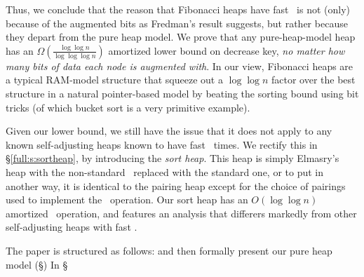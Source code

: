 Thus, we conclude that the reason that Fibonacci heaps have fast \opDc\ is not (only) because of the augmented bits as Fredman's result suggests, but rather because they depart from the pure heap model. We prove that any pure-heap-model heap has an $\Omega\left( \frac{\log \log n}{\log \log \log n} \right)$ amortized lower bound on decrease key, \emph{no matter how many bits of data each node is augmented with}. 
In our view, Fibonacci heaps are a typical RAM-model structure that squeeze out a $\log \log n$ factor over the best structure in a natural pointer-based model by beating the sorting bound using bit tricks (of which bucket sort is a very primitive example).


Given our lower bound, we still have the issue that it does not apply to any known self-adjusting heaps known to have fast \opDc\ times. We rectify this in \S\ref{full:s:sortheap}, by introducing the \emph{sort heap}. This heap is simply Elmasry's heap with the non-standard \opDc\ replaced with the standard one, or to put in another way, it is identical to the pairing heap except for the choice of pairings used to implement the \opEm\ operation. Our sort heap has an $O(\log \log n)$ amortized \opDc\ operation, and features an analysis that differers markedly from other self-adjusting heaps with fast \opDc.

The paper is structured as follows: 
and then formally present our pure heap model (\S{})
In \S{} 




